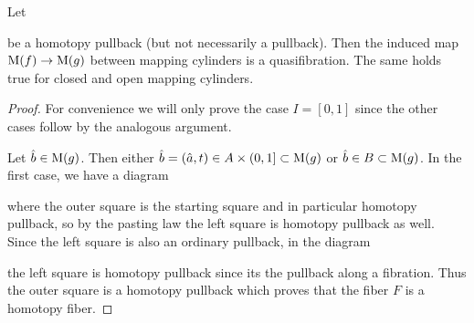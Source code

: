 \begin{lemma}\label{lem:mapOfCylIsQuasiFib} %
    Let 
    \begin{center}
    \end{center}
    be a homotopy pullback (but not necessarily a pullback).
    Then the induced map $\operatorname{M}(f)\to\operatorname{M}(g)$ between mapping cylinders is a quasifibration.
    The same holds true for closed and open mapping cylinders.
    \begin{proof}
        For convenience we will only prove the case $I=[0,1]$ since the other cases follow by the analogous argument.

        Let $\hat{b}\in\operatorname{M}(g)$. 
        Then either $\hat{b}=(\hat{a},t)\in A\times(0,1]\subset\operatorname{M}(g)$ or $\hat{b}\in B\subset\operatorname{M}(g)$.
        In the first case, we have a diagram
        \begin{center}
        \end{center}
        where the outer square is the starting square and in particular homotopy pullback, so by the pasting law the left square is homotopy pullback as well.
        Since the left square is also an ordinary pullback, in the diagram
        \begin{center}
        \end{center}
        the left square is homotopy pullback since its the pullback along a fibration.
        Thus the outer square is a homotopy pullback which proves that the fiber $F$ is a homotopy fiber.


\end{proof}
\end{lemma}
